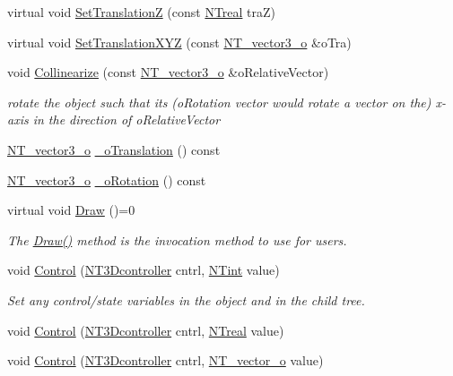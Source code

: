 \begin{DoxyCompactItemize}
\item 
virtual void \hyperlink{class_n_t3_d__object__o_af16008e0b22aa5209d39063a050af790}{SetTranslationZ} (const \hyperlink{nt__types_8h_a814a97893e9deb1eedcc7604529ba80d}{NTreal} traZ)
\item 
virtual void \hyperlink{class_n_t3_d__object__o_a678796ba0134f6f4278addec3e6e3a2d}{SetTranslationXYZ} (const \hyperlink{class_n_t__vector3__o}{NT\_\-vector3\_\-o} \&oTra)
\item 
void \hyperlink{class_n_t3_d__object__o_aace7586ce941a73bdd8a228b96538805}{Collinearize} (const \hyperlink{class_n_t__vector3__o}{NT\_\-vector3\_\-o} \&oRelativeVector)
\begin{DoxyCompactList}\small\item\em rotate the object such that its (oRotation vector would rotate a vector on the) x-\/axis in the direction of oRelativeVector \item\end{DoxyCompactList}\item 
\hyperlink{class_n_t__vector3__o}{NT\_\-vector3\_\-o} \hyperlink{class_n_t3_d__object__o_aa019e11ffe607ca90f79cd136396dfcb}{\_\-oTranslation} () const 
\item 
\hyperlink{class_n_t__vector3__o}{NT\_\-vector3\_\-o} \hyperlink{class_n_t3_d__object__o_a1229e46842d0513882bc57ca6f17aaa8}{\_\-oRotation} () const 
\item 
virtual void \hyperlink{class_n_t3_d__object__o_a908a81acc160ffb0de24bab5de55b3c0}{Draw} ()=0
\begin{DoxyCompactList}\small\item\em The \hyperlink{class_n_t3_d__object__o_a908a81acc160ffb0de24bab5de55b3c0}{Draw()} method is the invocation method to use for users. \item\end{DoxyCompactList}\item 
void \hyperlink{class_n_t3_d__object__o_a62890ce62f1a34040d637834f2669cf7}{Control} (\hyperlink{nt3d__object__obj_8h_ae59ecf13a3631bc4a9ea41f90de08351}{NT3Dcontroller} cntrl, \hyperlink{nt__types_8h_aee8aa0a9869e8b5c97c6c02217ff09cd}{NTint} value)
\begin{DoxyCompactList}\small\item\em Set any control/state variables in the object and in the child tree. \item\end{DoxyCompactList}\item 
void \hyperlink{class_n_t3_d__object__o_a116f64d41413aa5cb325987a4e716846}{Control} (\hyperlink{nt3d__object__obj_8h_ae59ecf13a3631bc4a9ea41f90de08351}{NT3Dcontroller} cntrl, \hyperlink{nt__types_8h_a814a97893e9deb1eedcc7604529ba80d}{NTreal} value)
\item 
void \hyperlink{class_n_t3_d__object__o_aa82e872ac54ba22b957185b961568f51}{Control} (\hyperlink{nt3d__object__obj_8h_ae59ecf13a3631bc4a9ea41f90de08351}{NT3Dcontroller} cntrl, \hyperlink{class_n_t__vector__o}{NT\_\-vector\_\-o} value)
\end{DoxyCompactItemize}
